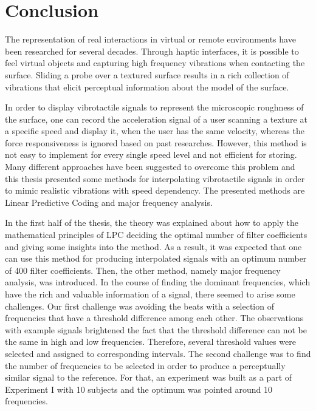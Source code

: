 \chapter{Conclusion}
\thispagestyle{empty}%
The representation of real interactions in virtual or remote environments have been researched for several decades. Through haptic interfaces, it is possible to feel virtual objects and capturing high frequency vibrations when contacting the surface. Sliding a probe over a textured surface results in a rich collection of vibrations that elicit perceptual information about the model of the surface.

In order to display vibrotactile signals to represent the microscopic roughness of the surface, one can record the acceleration signal of a user scanning a texture at a specific speed and display it, when the user has the same velocity, whereas the force responsiveness is ignored based on past researches. However, this method is not easy to implement for every single speed level and not efficient for storing. Many different approaches have been suggested to overcome this problem and this thesis presented some methods for interpolating vibrotactile signals in order to mimic realistic vibrations with speed dependency. The presented methods are Linear Predictive Coding and major frequency analysis.

In the first half of the thesis, the theory was explained about how to apply the mathematical principles of LPC deciding the optimal number of filter coefficients and giving some insights into the method. As a result, it was expected that one can use this method for producing interpolated signals with an optimum number of 400 filter coefficients. Then, the other method, namely major frequency analysis, was introduced. In the course of finding the dominant frequencies, which have the rich and valuable information of a signal, there seemed to arise some challenges. Our first challenge was avoiding the beats with a selection of frequencies that have a threshold difference among each other. The observations with example signals brightened the fact that the threshold difference can not be the same in high and low frequencies. Therefore, several threshold values were selected and assigned to corresponding intervals. The second challenge was to find the number of frequencies to be selected in order to produce a perceptually similar signal to the reference. For that, an experiment was built as a part of Experiment I with 10 subjects and the optimum was pointed around 10 frequencies.

